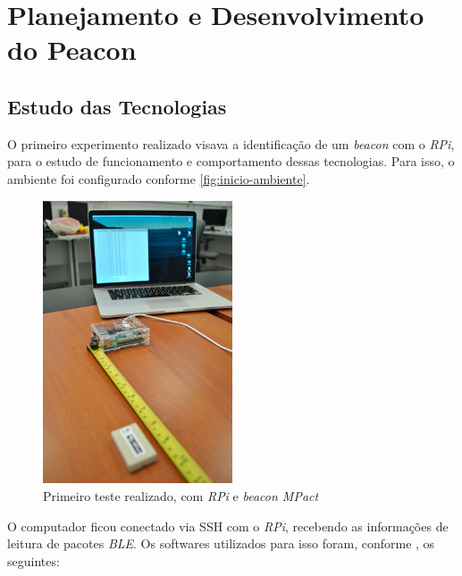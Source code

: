 \chapter{Planejamento e Desenvolvimento do Peacon}\label{cap:desenvolvimento}

\section{Estudo das Tecnologias}\label{sec:primeira-etapa}

O primeiro experimento realizado visava a identificação de um \textit{beacon} com o \textit{RPi}, para o estudo de funcionamento e comportamento dessas tecnologias. Para isso, o ambiente foi configurado conforme \autoref{fig:inicio-ambiente}. 

\begin{figure}[htb]
	\caption{\label{fig:inicio-ambiente}Primeiro teste realizado, com \textit{RPi} e \textit{beacon MPact}}
	\begin{center}
		\includegraphics[width=0.5\textwidth]{img/ambiente1.jpg}
	\end{center}
\end{figure}

O computador ficou conectado via SSH com o \textit{RPi}, recebendo as informações de leitura de pacotes \textit{BLE}. Os softwares utilizados para isso foram, conforme , os seguintes:

